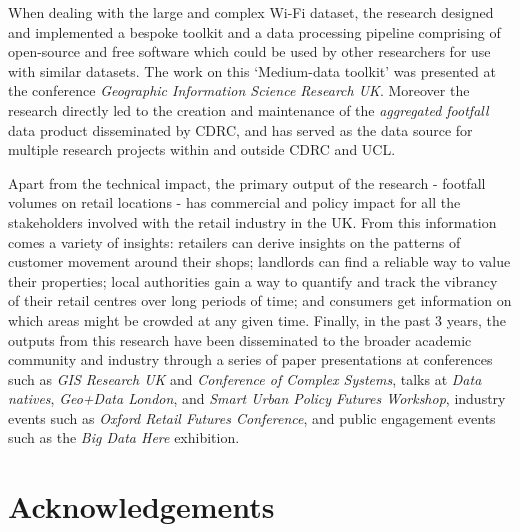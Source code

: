 When dealing with the large and complex Wi-Fi dataset, the research designed and implemented a bespoke toolkit and a data processing pipeline comprising of open-source and free software which could be used by other researchers for use with similar datasets.
The work on  this `Medium-data toolkit' was presented at the conference \textit{Geographic Information Science Research UK}.
Moreover the research directly led to the creation and maintenance of the \textit{aggregated footfall} data product disseminated by CDRC, and has served as the data source for multiple research projects within and outside CDRC and UCL.

Apart from the technical impact, the primary output of the research - footfall volumes on retail locations - has commercial and policy impact for all the stakeholders involved with the retail industry in the UK.
From this information comes a variety of insights: retailers can derive insights on the patterns of customer movement around their shops; landlords can find a reliable way to value their properties; local authorities gain a way to quantify and track the vibrancy of their retail centres over long periods of time; and consumers get information on which areas might be crowded at any given time.
Finally, in the past 3 years, the outputs from this research have been disseminated to the broader academic community and industry through a series of paper presentations at conferences such as \textit{GIS Research UK} and \textit{Conference of Complex Systems}, talks at \textit{Data natives}, \textit{Geo+Data London}, and \textit{Smart Urban Policy Futures Workshop}, industry events such as \textit{Oxford Retail Futures Conference}, and public engagement events such as the \textit{Big Data Here} exhibition.

\pagebreak

\section*{Acknowledgements} 


